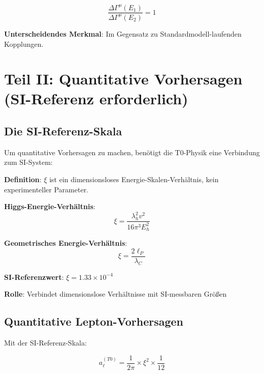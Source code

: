 \documentclass[12pt,a4paper]{article}
\newcommand{\xipar}{\xi}
\theoremstyle{definition}
\theoremstyle{remark}
\begin{document}
	\begin{equation}
		\boxed{\frac{\Delta\Gamma^{\mu}(E_1)}{\Delta\Gamma^{\mu}(E_2)} = 1}
		\label{eq:energy_independence_ratio}
	\end{equation}
	
	\textbf{Unterscheidendes Merkmal}: Im Gegensatz zu Standardmodell-laufenden Kopplungen.
	

	\section{Teil II: Quantitative Vorhersagen (SI-Referenz erforderlich)}
	
	\subsection{Die SI-Referenz-Skala}
	
	Um quantitative Vorhersagen zu machen, benötigt die T0-Physik eine Verbindung zum SI-System:
	
	\begin{tcolorbox}[colback=green!5!white,colframe=green!75!black,title=SI-Referenz-Skala (Kein Parameter!)]
		\textbf{Definition}: $\xipar$ ist ein dimensionsloses Energie-Skalen-Verhältnis, kein experimenteller Parameter.
		
		\textbf{Higgs-Energie-Verhältnis}:
		\begin{equation}
			\xipar = \frac{\lambda_h^2 v^2}{16\pi^3 E_h^2}
		\end{equation}
		
		\textbf{Geometrisches Energie-Verhältnis}:
		\begin{equation}
			\xipar = \frac{2\ell_P}{\lambda_C}
		\end{equation}
		
		\textbf{SI-Referenzwert}: $\xipar = 1.33 \times 10^{-4}$
		
		\textbf{Rolle}: Verbindet dimensionslose Verhältnisse mit SI-messbaren Größen
	\end{tcolorbox}
	
	\subsection{Quantitative Lepton-Vorhersagen}
	
	Mit der SI-Referenz-Skala:
	
	\begin{equation}
		a_{\ell}^{(T0)} = \frac{1}{2\pi} \times \xipar^2 \times \frac{1}{12}
		\label{eq:quantitative_lepton_correction}
	\end{equation}
	
\end{document}
